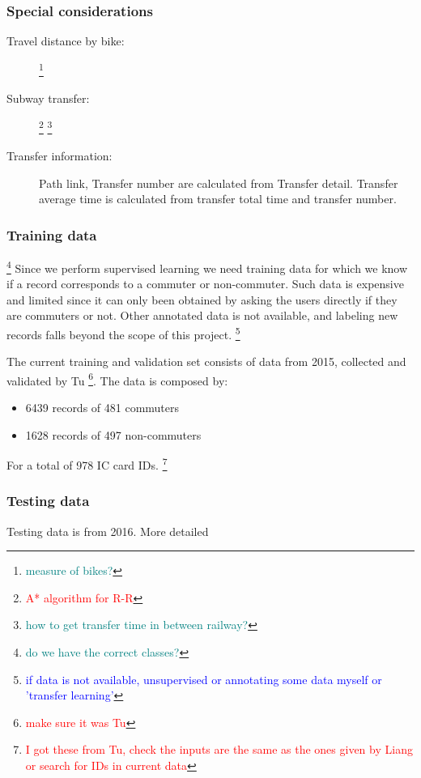 \documentclass{article}
\newcommand{\selfnote}[1]{\footnote{\textcolor{red}{#1}}}
\newcommand{\domainDoubt}[1]{\footnote{\textcolor{teal}{#1}}}
\newcommand{\technicalDoubt}[1]{\footnote{\textcolor{blue}{#1}}}
\begin{document}
\subsubsection{Special considerations}
\begin{description}%
\item[Travel distance by bike:] \domainDoubt{measure of bikes?}

\item[Subway transfer:] \selfnote{A* algorithm for R-R} \domainDoubt{how to get transfer time in between railway?}

\item[Transfer information:] Path link, Transfer number are calculated from Transfer detail. Transfer average time is calculated from transfer total time and transfer number. 

\end{description}


\subsubsection{Training data} \domainDoubt{do we have the correct classes?}
Since we perform supervised learning we need training data for which we know if a record corresponds to a commuter or non-commuter. Such data is expensive and limited since it can  only been obtained by asking the users directly if they are commuters or not. Other annotated data is not available, and labeling new records falls beyond the scope of this project. \technicalDoubt{if data is not available, unsupervised or annotating some data myself or 'transfer learning'}

The current training and validation set consists of data from 2015, collected and validated by Tu \cite{tu2016impact} \selfnote{make sure it was Tu}. The data is composed by:

\begin{itemize}
\item 6439 records of 481 commuters
\item 1628 records of 497 non-commuters
\end{itemize}

For a total of 978 IC card IDs. \selfnote{I got these from Tu, check the inputs are the same as the ones given by Liang or search for IDs in current data}

\subsubsection{Testing data}
Testing data is from 2016. More detailed
\end{document}
